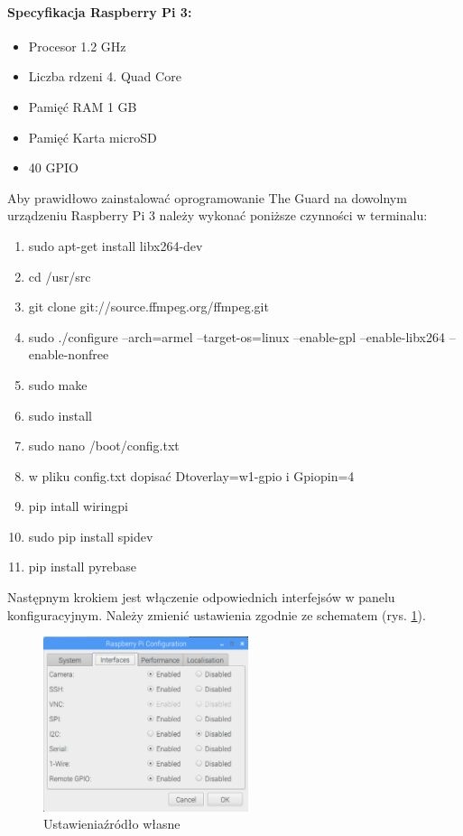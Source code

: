 \paragraph{Specyfikacja Raspberry Pi 3:}
\begin{itemize} 
\item Procesor 1.2 GHz
\item Liczba rdzeni 4. Quad Core
\item Pamięć RAM 1 GB
\item Pamięć Karta microSD
\item 40 GPIO
\end{itemize}
Aby prawidłowo zainstalować oprogramowanie The Guard na dowolnym urządzeniu Raspberry Pi 3 należy wykonać poniższe czynności w terminalu:
\begin{enumerate} 
\item sudo apt-get install libx264-dev
\item cd /usr/src
\item git clone git://source.ffmpeg.org/ffmpeg.git
\item sudo ./configure --arch=armel --target-os=linux --enable-gpl --enable-libx264 --enable-nonfree
\item sudo make
\item sudo install
\item sudo nano /boot/config.txt
\item w pliku config.txt dopisać Dtoverlay=w1-gpio i Gpiopin=4
\item pip intall wiringpi
\item sudo pip install spidev
\item pip install pyrebase
\end{enumerate}
Następnym krokiem jest włączenie odpowiednich interfejsów w panelu konfiguracyjnym. Należy zmienić ustawienia zgodnie ze schematem (rys. \ref{rs_settings}).
\begin{figure}[ht]
	\centering
	\includegraphics[width=6cm]{RSettings}
	\caption{Ustawienia\newline źródło własne}
	\label{rs_settings}
\end{figure}
